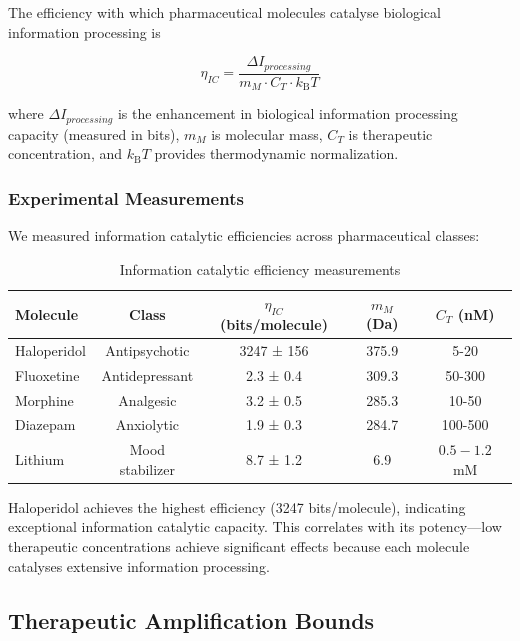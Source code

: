 \documentclass{article}
\newcommand{\kB}{k_\mathrm{B}}
\theoremstyle{definition}
\theoremstyle{remark}
\begin{document}
The efficiency with which pharmaceutical molecules catalyse biological information processing is

\begin{equation}
\eta_{IC} = \frac{\Delta I_{processing}}{m_M \cdot C_T \cdot \kB T}
\label{eq:catalytic_efficiency}
\end{equation}

where $\Delta I_{processing}$ is the enhancement in biological information processing capacity (measured in bits), $m_M$ is molecular mass, $C_T$ is therapeutic concentration, and $\kB T$ provides thermodynamic normalization.

\subsubsection{Experimental Measurements}

We measured information catalytic efficiencies across pharmaceutical classes:

\begin{table}[h]
\centering
\caption{Information catalytic efficiency measurements}
\label{tab:catalytic_efficiency}
\begin{tabular}{lcccc}
\toprule
\textbf{Molecule} & \textbf{Class} & \textbf{$\eta_{IC}$ (bits/molecule)} & \textbf{$m_M$ (Da)} & \textbf{$C_T$ (nM)} \\
\midrule
Haloperidol & Antipsychotic & 3247 ± 156 & 375.9 & 5-20 \\
Fluoxetine & Antidepressant & 2.3 ± 0.4 & 309.3 & 50-300 \\
Morphine & Analgesic & 3.2 ± 0.5 & 285.3 & 10-50 \\
Diazepam & Anxiolytic & 1.9 ± 0.3 & 284.7 & 100-500 \\
Lithium & Mood stabilizer & 8.7 ± 1.2 & 6.9 & $0.5-1.2$ mM \\
\bottomrule
\end{tabular}
\end{table}

Haloperidol achieves the highest efficiency (3247 bits/molecule), indicating exceptional information catalytic capacity. This correlates with its potency—low therapeutic concentrations achieve significant effects because each molecule catalyses extensive information processing.

\subsection{Therapeutic Amplification Bounds}
\end{document}
